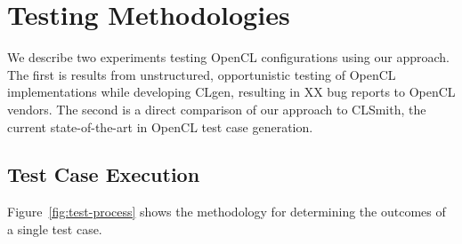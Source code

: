 \section{Testing Methodologies}\label{sec:methodology}

We describe two experiments testing OpenCL configurations using our approach. The first is results from unstructured, opportunistic testing of OpenCL implementations while developing CLgen, resulting in XX bug reports to OpenCL vendors. The second is a direct comparison of our approach to CLSmith, the current state-of-the-art in OpenCL test case generation.

% 

%
%

\subsection{Test Case Execution}



Figure~\ref{fig:test-process} shows the methodology for determining the outcomes of a single test case.


